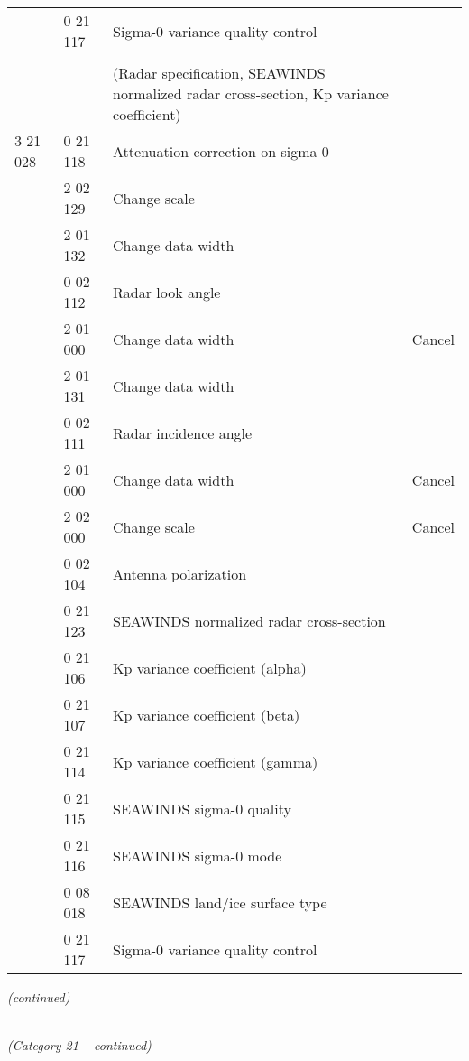 \begin{longtable}[]{@{}llll@{}}
& 0 21 117 & Sigma-0 variance quality control &\tabularnewline
& & &\tabularnewline
& & (Radar specification, SEAWINDS normalized radar cross-section, Kp variance coefficient) &\tabularnewline
3 21 028 & 0 21 118 & Attenuation correction on sigma-0 &\tabularnewline
& 2 02 129 & Change scale &\tabularnewline
& 2 01 132 & Change data width &\tabularnewline
& 0 02 112 & Radar look angle &\tabularnewline
& 2 01 000 & Change data width & Cancel\tabularnewline
& 2 01 131 & Change data width &\tabularnewline
& 0 02 111 & Radar incidence angle &\tabularnewline
& 2 01 000 & Change data width & Cancel\tabularnewline
& 2 02 000 & Change scale & Cancel\tabularnewline
& 0 02 104 & Antenna polarization &\tabularnewline
& 0 21 123 & SEAWINDS normalized radar cross-section &\tabularnewline
& 0 21 106 & Kp variance coefficient (alpha) &\tabularnewline
& 0 21 107 & Kp variance coefficient (beta) &\tabularnewline
& 0 21 114 & Kp variance coefficient (gamma) &\tabularnewline
& 0 21 115 & SEAWINDS sigma-0 quality &\tabularnewline
& 0 21 116 & SEAWINDS sigma-0 mode &\tabularnewline
& 0 08 018 & SEAWINDS land/ice surface type &\tabularnewline
& 0 21 117 & Sigma-0 variance quality control &\tabularnewline
\bottomrule
\end{longtable}

\emph{(continued)}

\emph{\\
(Category 21 -- continued)}

